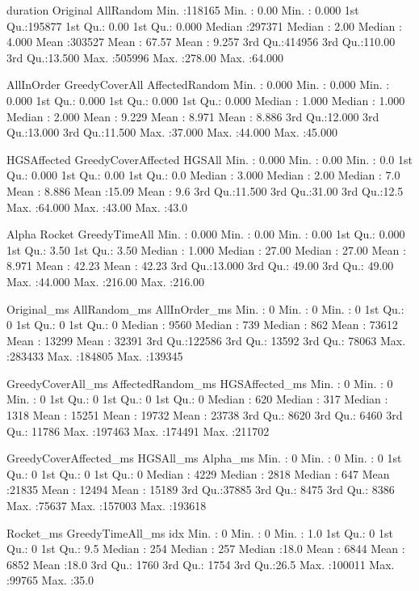     duration         Original        AllRandom     
Min.   :118165   Min.   :  0.00   Min.   : 0.000  
1st Qu.:195877   1st Qu.:  0.00   1st Qu.: 0.000  
Median :297371   Median :  2.00   Median : 4.000  
Mean   :303527   Mean   : 67.57   Mean   : 9.257  
3rd Qu.:414956   3rd Qu.:110.00   3rd Qu.:13.500  
Max.   :505996   Max.   :278.00   Max.   :64.000  

AllInOrder     GreedyCoverAll   AffectedRandom  
Min.   : 0.000   Min.   : 0.000   Min.   : 0.000  
1st Qu.: 0.000   1st Qu.: 0.000   1st Qu.: 0.000  
Median : 1.000   Median : 1.000   Median : 2.000  
Mean   : 9.229   Mean   : 8.971   Mean   : 8.886  
3rd Qu.:12.000   3rd Qu.:13.000   3rd Qu.:11.500  
Max.   :37.000   Max.   :44.000   Max.   :45.000  

HGSAffected     GreedyCoverAffected     HGSAll    
Min.   : 0.000   Min.   : 0.00       Min.   : 0.0  
1st Qu.: 0.000   1st Qu.: 0.00       1st Qu.: 0.0  
Median : 3.000   Median : 2.00       Median : 7.0  
Mean   : 8.886   Mean   :15.09       Mean   : 9.6  
3rd Qu.:11.500   3rd Qu.:31.00       3rd Qu.:12.5  
Max.   :64.000   Max.   :43.00       Max.   :43.0  

Alpha            Rocket       GreedyTimeAll   
Min.   : 0.000   Min.   :  0.00   Min.   :  0.00  
1st Qu.: 0.000   1st Qu.:  3.50   1st Qu.:  3.50  
Median : 1.000   Median : 27.00   Median : 27.00  
Mean   : 8.971   Mean   : 42.23   Mean   : 42.23  
3rd Qu.:13.000   3rd Qu.: 49.00   3rd Qu.: 49.00  
Max.   :44.000   Max.   :216.00   Max.   :216.00  

Original\_ms      AllRandom\_ms    AllInOrder\_ms   
Min.   :     0   Min.   :     0   Min.   :     0  
1st Qu.:     0   1st Qu.:     0   1st Qu.:     0  
Median :  9560   Median :   739   Median :   862  
Mean   : 73612   Mean   : 13299   Mean   : 32391  
3rd Qu.:122586   3rd Qu.: 13592   3rd Qu.: 78063  
Max.   :283433   Max.   :184805   Max.   :139345  

GreedyCoverAll\_ms AffectedRandom\_ms HGSAffected\_ms  
Min.   :     0    Min.   :     0    Min.   :     0  
1st Qu.:     0    1st Qu.:     0    1st Qu.:     0  
Median :   620    Median :   317    Median :  1318  
Mean   : 15251    Mean   : 19732    Mean   : 23738  
3rd Qu.:  8620    3rd Qu.:  6460    3rd Qu.: 11786  
Max.   :197463    Max.   :174491    Max.   :211702  

GreedyCoverAffected\_ms   HGSAll\_ms         Alpha\_ms     
Min.   :    0          Min.   :     0   Min.   :     0  
1st Qu.:    0          1st Qu.:     0   1st Qu.:     0  
Median : 4229          Median :  2818   Median :   647  
Mean   :21835          Mean   : 12494   Mean   : 15189  
3rd Qu.:37885          3rd Qu.:  8475   3rd Qu.:  8386  
Max.   :75637          Max.   :157003   Max.   :193618  

Rocket\_ms      GreedyTimeAll\_ms      idx      
Min.   :     0   Min.   :    0    Min.   : 1.0  
1st Qu.:     0   1st Qu.:    0    1st Qu.: 9.5  
Median :   254   Median :  257    Median :18.0  
Mean   :  6844   Mean   : 6852    Mean   :18.0  
3rd Qu.:  1760   3rd Qu.: 1754    3rd Qu.:26.5  
Max.   :100011   Max.   :99765    Max.   :35.0  
